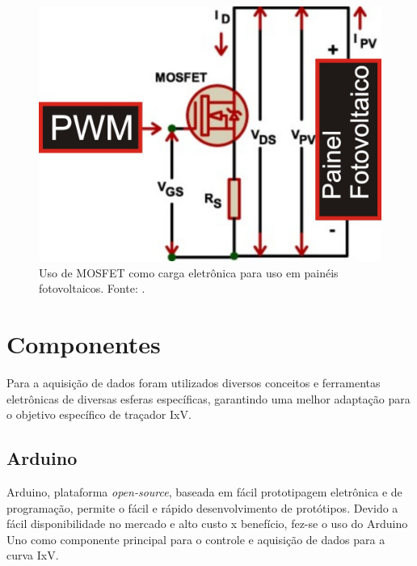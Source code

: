 \FloatBarrier
\begin{figure}[!htbp]
	\centering
	\includegraphics[scale=1]{imagens/MOSFET_LOAD}
	\caption{Uso de MOSFET como carga eletrônica para uso em painéis fotovoltaicos. Fonte: . }
	
	\label{fig:CargaELE}
\end{figure}
\FloatBarrier

\section{Componentes}

Para a aquisição de dados foram utilizados diversos conceitos e ferramentas eletrônicas de diversas esferas específicas, garantindo uma melhor adaptação para o objetivo específico de traçador IxV.%

\subsection{Arduino}
Arduino, plataforma \textit{open-source}, baseada em fácil prototipagem eletrônica e de programação, permite o fácil e rápido desenvolvimento de protótipos. Devido a fácil disponibilidade no mercado e alto custo x benefício, fez-se o uso do Arduino Uno como componente principal para o controle e aquisição de dados para a curva IxV.

